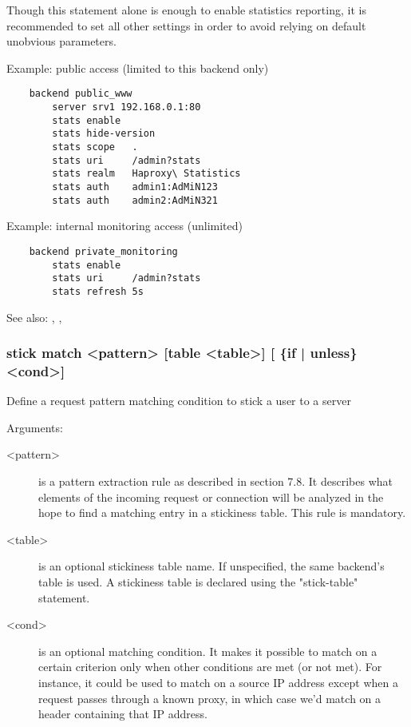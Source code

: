   Though this statement alone is enough to enable statistics reporting, it is
  recommended to set all other settings in order to avoid relying on default
  unobvious parameters.

  Example: public access (limited to this backend only)
  \begin{verbatim}
    backend public_www
        server srv1 192.168.0.1:80
        stats enable
        stats hide-version
        stats scope   .
        stats uri     /admin?stats
        stats realm   Haproxy\ Statistics
        stats auth    admin1:AdMiN123
        stats auth    admin2:AdMiN321
  \end{verbatim}

  Example: internal monitoring access (unlimited)
  \begin{verbatim}
    backend private_monitoring
        stats enable
        stats uri     /admin?stats
        stats refresh 5s
  \end{verbatim}

  See also: , , 

\subsubsection[stick match]{stick match <pattern> [table <table>] [ \{if | unless\} <cond>]}


  Define a request pattern matching condition to stick a user to a server


  Arguments:
  \begin{description}
  \item[<pattern>] is a pattern extraction rule as described in section 7.8. It
               describes what elements of the incoming request or connection
               will be analyzed in the hope to find a matching entry in a
               stickiness table. This rule is mandatory.

  \item[<table>] is an optional stickiness table name. If unspecified, the same
               backend's table is used. A stickiness table is declared using
               the "stick-table" statement.

  \item[<cond>] is an optional matching condition. It makes it possible to match
               on a certain criterion only when other conditions are met (or
               not met). For instance, it could be used to match on a source IP
               address except when a request passes through a known proxy, in
               which case we'd match on a header containing that IP address.
  \end{description}

